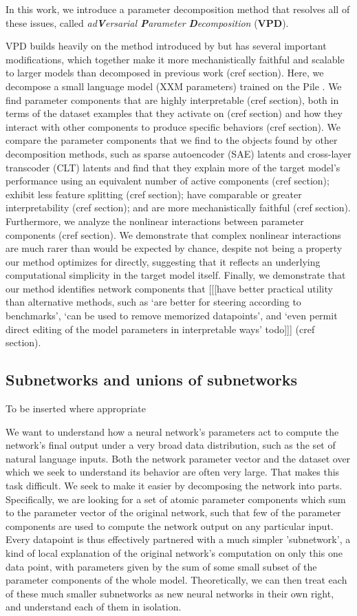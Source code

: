 \documentclass{article}
\begin{document}
In this work, we introduce a parameter decomposition method that resolves all of these issues, called \textit{ad\textbf{V}ersarial \textbf{P}arameter \textbf{D}ecomposition} (\textbf{VPD}). 

VPD builds heavily on the method introduced by \cite{bushnaq2025spd} but has several important modifications, which together make it more mechanistically faithful and scalable to larger models than decomposed in previous work (cref section). Here, we decompose a small language model (XXM parameters) trained on the Pile \cite{gao2020pile}. We find parameter components that are highly interpretable (cref section), both in terms of the dataset examples that they activate on (cref section) and how they interact with other components to produce specific behaviors (cref section). We compare the parameter components that we find to the objects found by other decomposition methods, such as sparse autoencoder (SAE) latents and cross-layer transcoder (CLT) latents and find that they explain more of the target model's performance using an equivalent number of active components (cref section); exhibit less feature splitting (cref section); have comparable or greater interpretability (cref section); and are more mechanistically faithful (cref section). Furthermore, we analyze the nonlinear interactions between parameter components (cref section). We demonstrate that complex nonlinear interactions are much rarer than would be expected by chance, despite not being a property our method optimizes for directly, suggesting that it reflects an underlying computational simplicity in the target model itself. Finally, we demonstrate that our method identifies network components that [[[have better practical utility than alternative methods, such as `are better for steering according to benchmarks', `can be used to remove memorized datapoints', and `even permit direct editing of the model parameters in interpretable ways' todo]]]  (cref section).
\subsection{Subnetworks and unions of subnetworks} 
To be inserted where appropriate

We want to understand how a neural network's parameters act to compute the network's final output under a very broad data distribution, such as the set of natural language inputs. Both the network parameter vector and the dataset over which we seek to understand its behavior are often very large. That makes this task difficult. We seek to make it easier by decomposing the network into parts. Specifically, we are looking for a set of atomic parameter components which sum to the parameter vector of the original network, such that few of the parameter components are used to compute the network output on any particular input. Every datapoint is thus effectively partnered with a much simpler 'subnetwork', a kind of local explanation of the original network's computation on only this one data point, with parameters given by the sum of some small subset of the parameter components of the whole model. Theoretically, we can then treat each of these much smaller subnetworks as new neural networks in their own right, and understand each of them in isolation.
\end{document}
